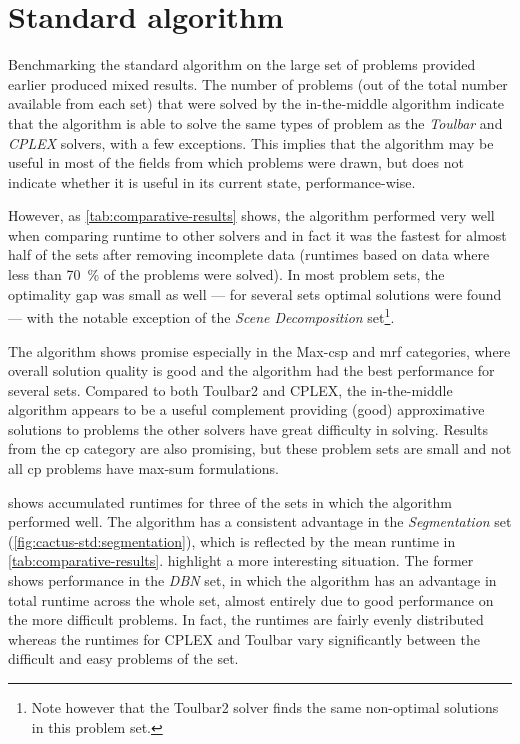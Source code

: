 \section{Standard algorithm}
Benchmarking the standard algorithm on the large set of problems provided earlier produced mixed results.
The number of problems (out of the total number available from each set) that were solved by the in-the-middle algorithm indicate that the algorithm is able to solve the same types of problem as the \emph{Toulbar} and \emph{CPLEX} solvers, with a few exceptions.
This implies that the algorithm may be useful in most of the fields from which problems were drawn, but does not indicate whether it is useful in its current state, performance-wise.

However, as \cref{tab:comparative-results} shows, the algorithm performed very well when comparing runtime to other solvers and in fact it was the fastest for almost half of the sets after removing incomplete data (runtimes based on data where less than \SI{70}{\percent} of the problems were solved).
In most problem sets, the optimality gap was small as well --- for several sets optimal solutions were found --- with the notable exception of the \emph{Scene Decomposition} set\footnote{Note however that the Toulbar2 solver finds the same non-optimal solutions in this problem set.}.

The algorithm shows promise especially in the Max-\gls{csp} and \gls{mrf} categories, where overall solution quality is good and the algorithm had the best performance for several sets.
Compared to both Toulbar2 and CPLEX, the in-the-middle algorithm appears to be a useful complement providing (good) approximative solutions to problems the other solvers have great difficulty in solving.
Results from the \gls{cp} category are also promising, but these problem sets are small and not all \gls{cp} problems have max-sum formulations.

 shows accumulated runtimes for three of the sets in which the algorithm performed well.
The algorithm has a consistent advantage in the \emph{Segmentation} set (\cref{fig:cactus-std:segmentation}), which is reflected by the mean runtime in \cref{tab:comparative-results}.
 highlight a more interesting situation.
The former shows performance in the \emph{DBN} set, in which the algorithm has an advantage in total runtime across the whole set, almost entirely due to good performance on the more difficult problems.
In fact, the runtimes are fairly evenly distributed whereas the runtimes for CPLEX and Toulbar vary significantly between the difficult and easy problems of the set.

